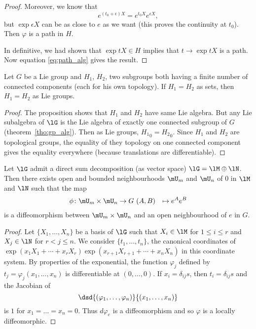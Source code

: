 \begin{proof}
Moreover, we know that
\[
  e^{(t_0+\epsilon)X}=e^{t_0X}e^{\epsilon X},
\]
but $\exp \epsilon X$ can be as close to $e$ as we want (this proves the continuity at $t_0$). Then $\varphi$ is a path in $H$.

In definitive, we had shown that $\exp tX\in H$ implies that $t\to\exp tX$ is a path. Now equation \eqref{eq:path_alg} gives the result.
\end{proof}

\begin{corollary}
Let $G$ be a Lie group and $H_1$, $H_2$, two subgroups both having a finite number of connected components (each for his own topology). If $H_1=H_2$ as sets, then $H_1=H_2$ as Lie groups.
\end{corollary}

\begin{proof}
The proposition shows that $H_1$ and $H_2$ have same Lie algebra. But any Lie subalgebra of $\lG$ is the Lie algebra of exactly one connected subgroup of $G$ (theorem~\ref{tho:gp_alg}). Then as Lie groups, ${H_1}_0={H_2}_0$. Since $H_1$ and $H_2$ are topological groups, the equality of they topology on one connected component gives the equality everywhere (because translations are differentiable).
\end{proof}

\begin{lemma}
Let $\lG$ admit a direct sum decomposition (as vector space) $\lG=\lM\oplus\lN$. Then there exists open and bounded neighbourhoods $\mU_m$ and $\mU_n$ of $0$ in $\lM$ and $\lN$ such that the map
		\begin{equation}
		\begin{aligned}
			\phi \colon \mU_m\times\mU_n &\to G\
			(A,B)&\mapsto e^Ae^B
		\end{aligned}
	\end{equation}
is a diffeomorphism between $\mU_m\times\mU_n$ and an open neighbourhood of $e$ in $G$.
 \label{lem:decomp}
\end{lemma}


\begin{proof}
Let $\{X_1,\ldots,X_n\}$ be a basis of $\lG$ such that $X_i\in\lM$ for $1\leq i\leq r$ and $X_j\in\lN$ for $r<j\leq n$. We consider $\{t_1,\ldots,t_n\}$, the canonical coordinates of $\exp(x_1X_1+\cdots+x_rX_r)\exp(x_{r+1}X_{r+1}+\cdots+x_nX_n)$ in this coordinate system. By properties of the exponential, the function $\varphi_j$ defined by $t_j=\varphi_j(x_1,\ldots,x_n)$ is differentiable at $(0,\ldots,0)$. If $x_i=\delta_{ij}s$, then $t_i=\delta_{ij}s$ and the Jacobian of
\[
   \dsd{(\varphi_1,\ldots,\varphi_n)}{(x_1,\ldots,x_n)}
\]
is $1$ for $x_1=\ldots=x_n=0$. Thus $d\varphi_e$ is a diffeomorphism and so $\varphi$ is a locally diffeomorphic.
\end{proof}


